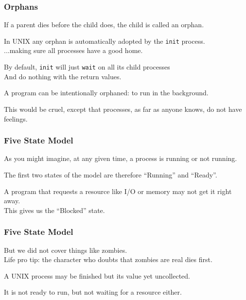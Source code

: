 \begin{frame}
\frametitle{Orphans}

If a parent dies before the child does, the child is called an \alert{orphan}. 

In UNIX any orphan is automatically adopted by the \texttt{init} process.\\
\quad ...making sure all processes have a good home. 

By default, \texttt{init} will just \texttt{wait} on all its child processes\\
\quad And do nothing with the return values.

A program can be intentionally orphaned: to run in the background.


This would be cruel, except that processes, as far as anyone knows, do not have feelings.


\end{frame}


\begin{frame}
\frametitle{Five State Model}

As you might imagine, at any given time, a process is running or not running. 

The first two states of the model are therefore ``Running'' and ``Ready''.

A program that requests a resource like I/O or memory may not get it right away.\\
\quad This gives us the ``Blocked'' state.

\end{frame}


\begin{frame}
\frametitle{Five State Model}

But we did not cover things like zombies.\\
\quad Life pro tip: the character who doubts that zombies are real dies first.

A UNIX process may be finished but its value yet uncollected.

It is not ready to run, but not waiting for a resource either.

\end{frame}


